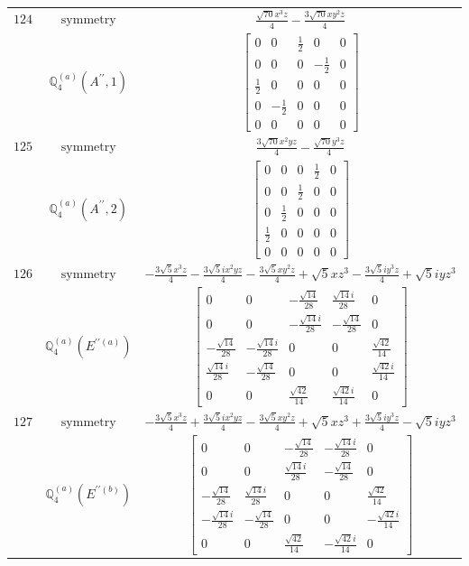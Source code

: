 \documentclass[fleqn,8pt,landscape]{jsarticle}
\begin{document}
\begin{longtable}{ccc}
$ 124 $ & $ \text{symmetry} $ & $ \frac{\sqrt{70} x^{3} z}{4} - \frac{3 \sqrt{70} x y^{2} z}{4} $ \\
$  $ & $ \mathbb{Q}_{4}^{(a)}(A^{\prime\prime},1) $ & $ \begin{bmatrix} 0 & 0 & \frac{1}{2} & 0 & 0 \\ 0 & 0 & 0 & - \frac{1}{2} & 0 \\ \frac{1}{2} & 0 & 0 & 0 & 0 \\ 0 & - \frac{1}{2} & 0 & 0 & 0 \\ 0 & 0 & 0 & 0 & 0 \end{bmatrix} $ \\ \hline
$ 125 $ & $ \text{symmetry} $ & $ \frac{3 \sqrt{70} x^{2} y z}{4} - \frac{\sqrt{70} y^{3} z}{4} $ \\
$  $ & $ \mathbb{Q}_{4}^{(a)}(A^{\prime\prime},2) $ & $ \begin{bmatrix} 0 & 0 & 0 & \frac{1}{2} & 0 \\ 0 & 0 & \frac{1}{2} & 0 & 0 \\ 0 & \frac{1}{2} & 0 & 0 & 0 \\ \frac{1}{2} & 0 & 0 & 0 & 0 \\ 0 & 0 & 0 & 0 & 0 \end{bmatrix} $ \\ \hline
$ 126 $ & $ \text{symmetry} $ & $ - \frac{3 \sqrt{5} x^{3} z}{4} - \frac{3 \sqrt{5} i x^{2} y z}{4} - \frac{3 \sqrt{5} x y^{2} z}{4} + \sqrt{5} x z^{3} - \frac{3 \sqrt{5} i y^{3} z}{4} + \sqrt{5} i y z^{3} $ \\
$  $ & $ \mathbb{Q}_{4}^{(a)}(E^{\prime\prime(a)}) $ & $ \begin{bmatrix} 0 & 0 & - \frac{\sqrt{14}}{28} & \frac{\sqrt{14} i}{28} & 0 \\ 0 & 0 & - \frac{\sqrt{14} i}{28} & - \frac{\sqrt{14}}{28} & 0 \\ - \frac{\sqrt{14}}{28} & - \frac{\sqrt{14} i}{28} & 0 & 0 & \frac{\sqrt{42}}{14} \\ \frac{\sqrt{14} i}{28} & - \frac{\sqrt{14}}{28} & 0 & 0 & \frac{\sqrt{42} i}{14} \\ 0 & 0 & \frac{\sqrt{42}}{14} & \frac{\sqrt{42} i}{14} & 0 \end{bmatrix} $ \\ \hline
$ 127 $ & $ \text{symmetry} $ & $ - \frac{3 \sqrt{5} x^{3} z}{4} + \frac{3 \sqrt{5} i x^{2} y z}{4} - \frac{3 \sqrt{5} x y^{2} z}{4} + \sqrt{5} x z^{3} + \frac{3 \sqrt{5} i y^{3} z}{4} - \sqrt{5} i y z^{3} $ \\
$  $ & $ \mathbb{Q}_{4}^{(a)}(E^{\prime\prime(b)}) $ & $ \begin{bmatrix} 0 & 0 & - \frac{\sqrt{14}}{28} & - \frac{\sqrt{14} i}{28} & 0 \\ 0 & 0 & \frac{\sqrt{14} i}{28} & - \frac{\sqrt{14}}{28} & 0 \\ - \frac{\sqrt{14}}{28} & \frac{\sqrt{14} i}{28} & 0 & 0 & \frac{\sqrt{42}}{14} \\ - \frac{\sqrt{14} i}{28} & - \frac{\sqrt{14}}{28} & 0 & 0 & - \frac{\sqrt{42} i}{14} \\ 0 & 0 & \frac{\sqrt{42}}{14} & - \frac{\sqrt{42} i}{14} & 0 \end{bmatrix} $ \\ \hline

\end{longtable}
\end{document}

